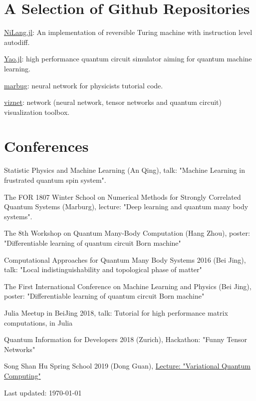 \documentclass[letterpaper]{article}
\def\footerlink{}   %
\renewenvironment{itemize}{
  \begin{list}{}{
    \setlength{\leftmargin}{1.5em}
  }
}{
  \end{list}
}
\begin{document}
\section*{A Selection of Github Repositories}
\begin{itemize}
    \item \href{https://github.com/GiggleLiu/NiLang.jl}{NiLang.jl}: An implementation of reversible Turing machine with instruction level autodiff.
    \item \href{https://github.com/QuantumBFS/Yao.jl}{Yao.jl}: high performance quantum circuit simulator aiming for quantum machine learning.
    \item \href{https://github.com/GiggleLiu/marburg}{marbug}: neural network for physicists tutorial code.
    \item \href{https://github.com/GiggleLiu/viznet}{viznet}: network (neural network, tensor networks and quantum circuit) visualization toolbox.
\end{itemize}

\section*{Conferences}
\begin{itemize}
    \item [1] Statistic Physics and Machine Learning (An Qing), talk: "Machine Learning in frustrated quantum spin system".
    \item [2] The FOR 1807 Winter School on Numerical Methods for Strongly Correlated Quantum Systems (Marburg), lecture: "Deep learning and quantum many body systems".
    \item [3] The 8th Workshop on Quantum Many-Body Computation (Hang Zhou), poster: "Differentiable learning of quantum circuit Born machine"
    \item [4] Computational Approaches for Quantum Many Body Systems 2016 (Bei Jing), talk: "Local indistinguishability and topological phase of matter"
    \item [5] The First International Conference on Machine Learning and Physics (Bei Jing), poster: "Differentiable learning of quantum circuit Born machine"
    \item [6] Julia Meetup in BeiJing 2018, talk: Tutorial for high performance matrix computations, in Julia
    \item [7] Quantum Information for Developers 2018 (Zurich), Hackathon: "Funny Tensor Networks"
    \item [8] Song Shan Hu Spring School 2019 (Dong Guan), \href{https://github.com/QuantumBFS/SSSS}{Lecture: "Variational Quantum Computing"}
\end{itemize}

\bigskip

\begin{center}
  \begin{footnotesize}
    Last updated: \today \\
    \href{\footerlink}{\texttt{\footerlink}}
  \end{footnotesize}
\end{center}
\end{document}
